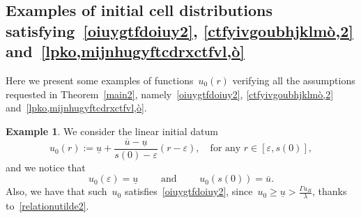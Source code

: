 \documentclass[12pt,a4paper,intlimits,sumlimits]{amsart}
\theoremstyle{definition}
\newtheorem{example}[definition]{Example}
\theoremstyle{plain}
\numberwithin{equation}{section}
\renewcommand{\ge}{\geqslant}
\begin{document}
\begin{appendix}

\section{Examples of initial cell distributions satisfying~\eqref{oiuygtfdoiuy2}, \eqref{ctfyivgoubhjklmò,2} and~\eqref{lpko,mijnhugyftcdrxctfvl,ò}}\label{apprdfctbhjkl–òlkjhbgvfdrdxcfvgbhnjmk,}

Here we present some examples of functions~$u_0(r)$ verifying all the assumptions requested in Theorem~\ref{main2}, namely~\eqref{oiuygtfdoiuy2}, \eqref{ctfyivgoubhjklmò,2} and~\eqref{lpko,mijnhugyftcdrxctfvl,ò}.

\begin{example}\label{Exc1}
We consider the linear initial datum
\[
u_0(r):= \underline u +\dfrac{\overline u -\underline u}{s(0)-\varepsilon}(r-\varepsilon),\quad {\mbox{for any }}r\in [\varepsilon, s(0)],
\]
and we notice that
\[
u_0(\varepsilon)=\underline u \qquad\mbox{ and }\qquad u_0(s(0))=\overline u.
\]
Also, we have that such~$u_0$ satisfies~\eqref{oiuygtfdoiuy2}, since~$u_0\ge \underline u>\frac{\Gamma u_B}{\lambda}$,
thanks to~\eqref{relationutilde2}.


\end{example}
\end{appendix}
\end{document}
